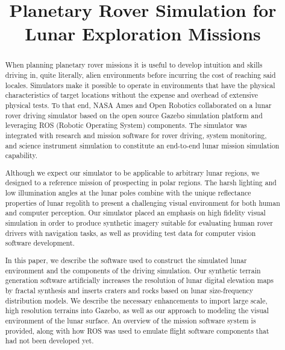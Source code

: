 \documentclass[twocolumn,letterpaper]{IEEEAerospaceCLS}  %
\begin{document}
\title{Planetary Rover Simulation for Lunar Exploration Missions}

\author{%
}

\maketitle

\thispagestyle{plain}
\pagestyle{plain}

\maketitle

\thispagestyle{plain}
\pagestyle{plain}

\begin{abstract}

When planning planetary rover missions it is useful to develop intuition and skills driving in, quite literally, alien environments before incurring the cost of reaching said locales. Simulators make it possible to operate in environments that have the physical characteristics of target locations without the expense and overhead of extensive physical tests. To that end, NASA Ames and Open Robotics collaborated on a lunar rover driving simulator based on the open source Gazebo simulation platform and leveraging ROS (Robotic Operating System) components. The simulator was integrated with research and mission software for rover driving, system monitoring, and science instrument simulation to constitute an end-to-end lunar mission simulation capability.

Although we expect our simulator to be applicable to arbitrary lunar regions, we designed to a reference mission of prospecting in polar regions. The harsh lighting and low illumination angles at the lunar poles combine with the unique reflectance properties of lunar regolith to present a challenging visual environment for both human and computer perception. Our simulator placed an emphasis on high fidelity visual simulation in order to produce synthetic imagery suitable for evaluating human rover drivers with navigation tasks, as well as providing test data for computer vision software development.

In this paper, we describe the software used to construct the simulated lunar environment and the components of the driving simulation. Our synthetic terrain generation software artificially increases the resolution of lunar digital elevation maps by fractal synthesis and inserts craters and rocks based on lunar size-frequency distribution models. We describe the necessary enhancements to import large scale, high resolution terrains into Gazebo, as well as our approach to modeling the visual environment of the lunar surface. An overview of the mission software system is provided, along with how ROS was used to emulate flight software components that had not been developed yet.


\end{abstract}
\end{document}

